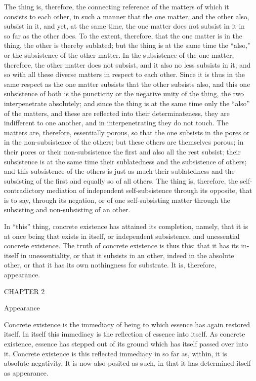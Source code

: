 The thing is, therefore, the connecting reference of the matters
of which it consists to each other, in such a manner
that the one matter, and the other also, subsist in it,
and yet, at the same time, the one matter does not subsist
in it in so far as the other does.
To the extent, therefore, that the one matter is in the thing,
the other is thereby sublated; 
but the thing is at the same
time the “also,” or the subsistence of the other matter.
In the subsistence of the one matter, therefore,
the other matter does not subsist,
and it also no less subsists in it;
and so with all these diverse matters
in respect to each other.
Since it is thus in the same respect 
as the one matter subsists 
that the other subsists also, 
and this one subsistence of both is
the puncticity or the negative unity of the thing,
the two interpenetrate absolutely;
and since the thing is at the same time
only the “also” of the matters,
and these are reflected into their determinateness,
they are indifferent to one another,
and in interpenetrating they do not touch.
The matters are, therefore, essentially porous,
so that the one subsists in the pores
or in the non-subsistence of the others;
but these others are themselves porous;
in their pores or their non-subsistence
the first and also all the rest subsist;
their subsistence is at the same time
their sublatedness and the subsistence of others;
and this subsistence of the others is
just as much their sublatedness
and the subsisting of the first
and equally so of all others.
The thing is, therefore,
the self-contradictory mediation of
independent self-subsistence through its opposite,
that is to say, through its negation,
or of one self-subsisting matter
through the subsisting and non-subsisting of an other.

In “this” thing, concrete existence has attained its completion,
namely, that it is at once being that exists in itself,
or independent subsistence, and unessential concrete existence.
The truth of concrete existence is thus this:
that it has its in-itself in unessentiality,
or that it subsists in an other,
indeed in the absolute other,
or that it has its own nothingness for substrate.
It is, therefore, appearance.

CHAPTER 2

Appearance

Concrete existence is the immediacy of being
to which essence has again restored itself.
In itself this immediacy is the reflection of essence into itself.
As concrete existence, essence has stepped out of its ground
which has itself passed over into it.
Concrete existence is this reflected immediacy in so far
as, within, it is absolute negativity.
It is now also posited as such,
in that it has determined itself as appearance.

